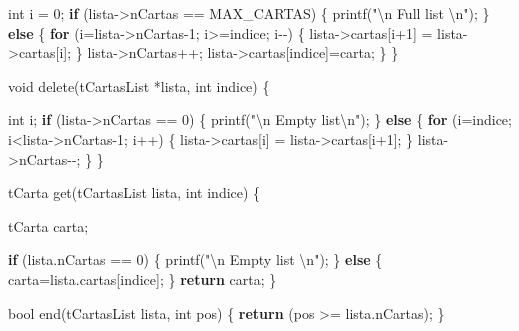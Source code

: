 \documentclass[
]{book}
\newenvironment{Shaded}{\begin{snugshade}}{\end{snugshade}}
\newcommand{\ControlFlowTok}[1]{\textcolor[rgb]{0.13,0.29,0.53}{\textbf{#1}}}
\newcommand{\DataTypeTok}[1]{\textcolor[rgb]{0.13,0.29,0.53}{#1}}
\newcommand{\DecValTok}[1]{\textcolor[rgb]{0.00,0.00,0.81}{#1}}
\newcommand{\NormalTok}[1]{#1}
\newcommand{\SpecialCharTok}[1]{\textcolor[rgb]{0.00,0.00,0.00}{#1}}
\newcommand{\StringTok}[1]{\textcolor[rgb]{0.31,0.60,0.02}{#1}}
\begin{document}
\begin{Shaded}
\begin{Highlighting}[]
    \DataTypeTok{int}\NormalTok{ i = }\DecValTok{0}\NormalTok{;}
    \ControlFlowTok{if}\NormalTok{ (lista{-}\textgreater{}nCartas == MAX\_CARTAS) \{}
\NormalTok{        printf(}\StringTok{"}\SpecialCharTok{\textbackslash{}n}\StringTok{ Full list }\SpecialCharTok{\textbackslash{}n}\StringTok{"}\NormalTok{);}
\NormalTok{    \} }\ControlFlowTok{else}\NormalTok{ \{}
        \ControlFlowTok{for}\NormalTok{ (i=lista{-}\textgreater{}nCartas{-}}\DecValTok{1}\NormalTok{; i\textgreater{}=indice; i{-}{-}) \{}
\NormalTok{            lista{-}\textgreater{}cartas[i+}\DecValTok{1}\NormalTok{] = lista{-}\textgreater{}cartas[i];}
\NormalTok{        \}}
\NormalTok{        lista{-}\textgreater{}nCartas++;}
\NormalTok{        lista{-}\textgreater{}cartas[indice]=carta;}
\NormalTok{    \}}
\NormalTok{\}}

\DataTypeTok{void}\NormalTok{ delete(tCartasList *lista, }\DataTypeTok{int}\NormalTok{ indice) \{}

    \DataTypeTok{int}\NormalTok{ i;}
    \ControlFlowTok{if}\NormalTok{ (lista{-}\textgreater{}nCartas == }\DecValTok{0}\NormalTok{) \{}
\NormalTok{        printf(}\StringTok{"}\SpecialCharTok{\textbackslash{}n}\StringTok{ Empty list}\SpecialCharTok{\textbackslash{}n}\StringTok{"}\NormalTok{);}
\NormalTok{    \} }\ControlFlowTok{else}\NormalTok{ \{}
        \ControlFlowTok{for}\NormalTok{ (i=indice; i\textless{}lista{-}\textgreater{}nCartas{-}}\DecValTok{1}\NormalTok{; i++) \{}
\NormalTok{            lista{-}\textgreater{}cartas[i] = lista{-}\textgreater{}cartas[i+}\DecValTok{1}\NormalTok{];}
\NormalTok{        \}}
\NormalTok{        lista{-}\textgreater{}nCartas{-}{-};}
\NormalTok{    \}}
\NormalTok{\}}

\NormalTok{tCarta get(tCartasList lista, }\DataTypeTok{int}\NormalTok{ indice) \{}

\NormalTok{    tCarta carta;}

    \ControlFlowTok{if}\NormalTok{ (lista.nCartas == }\DecValTok{0}\NormalTok{) \{}
\NormalTok{        printf(}\StringTok{"}\SpecialCharTok{\textbackslash{}n}\StringTok{ Empty list }\SpecialCharTok{\textbackslash{}n}\StringTok{"}\NormalTok{);}
\NormalTok{    \} }\ControlFlowTok{else}\NormalTok{ \{}
\NormalTok{        carta=lista.cartas[indice];}
\NormalTok{    \}}
    \ControlFlowTok{return}\NormalTok{ carta;}
\NormalTok{\}}

\DataTypeTok{bool}\NormalTok{ end(tCartasList lista, }\DataTypeTok{int}\NormalTok{ pos) \{}
    \ControlFlowTok{return}\NormalTok{ (pos \textgreater{}= lista.nCartas);}
\NormalTok{\}}


\end{Highlighting}
\end{Shaded}
\end{document}
